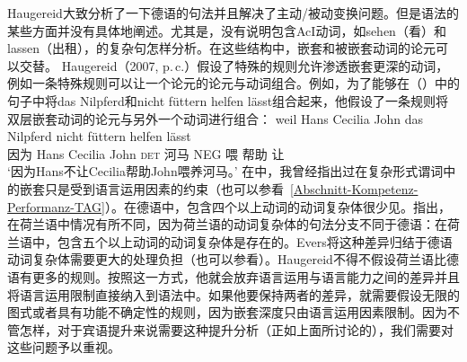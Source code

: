 \begin{exe}
\begin{xlist}[iv.]
\begin{exe}
\begin{xlist}[iv.]
Haugereid大致分析了一下德语的句法并且解决了主动/被动变换问题。但是语法的某些方面并没有具体地阐述。尤其是，没有说明包含AcI动词，如sehen（看）和lassen（出租），的复杂句怎样分析。在这些结构中，嵌套和被嵌套动词的论元可以交替。 Haugereid（2007, p.\,c.）假设了特殊的规则允许渗透嵌套更深的动词，例如一条特殊规则可以让一个论元的论元与动词组合。例如，为了能够在（）中的句子中将das Nilpferd和nicht füttern helfen lässt组合起来，他假设了一条规则将双层嵌套动词的论元与另外一个动词进行组合：
\ea
\label{ex-nilpferd-fuettern-helfen-laesst}
\gll weil    Hans Cecilia John das Nilpferd nicht füttern helfen lässt\\
     因为 Hans Cecilia John \textsc{det} 河马 NEG 喂 帮助 让\\
\glt `因为Hans不让Cecilia帮助John喂养河马。'
\z
在\citet[]{Mueller2004b}中，我曾经指出过在复杂形式谓词中的嵌套只是受到语言运用因素的约束（也可以参看~\ref{Abschnitt-Kompetenz-Performanz-TAG}）。在德语中，包含四个以上动词的动词复杂体很少见。\citet[--59]{Evers75a}指出，在荷兰语中情况有所不同，因为荷兰语的动词复杂体的句法分支不同于德语：在荷兰语中，包含五个以上动词的动词复杂体是存在的。Evers将这种差异归结于德语动词复杂体需要更大的处理负担（也可以参看\citealp[\S~3.7]{Gibson98a}）。Haugereid不得不假设荷兰语比德语有更多的规则。按照这一方式，他就会放弃语言运用与语言能力之间的差异并且将语言运用限制直接纳入到语法中。如果他要保持两者的差异，就需要假设无限的图式或者具有功能不确定性的规则，因为嵌套深度只由语言运用因素限制\citep{HN94a}。因为不管怎样，对于宾语提升来说需要这种提升分析（正如上面所讨论的），我们需要对这些问题予以重视。

\end{xlist}
\end{exe}
\end{xlist}
\end{exe}

